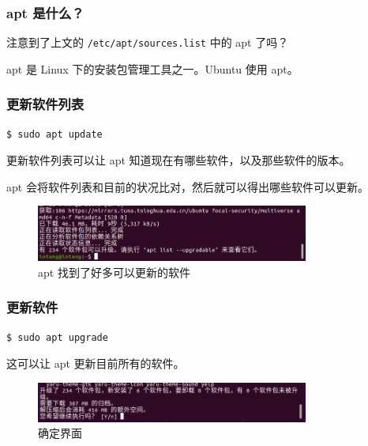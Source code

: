 \documentclass[UTF-8]{ctexart}
\begin{document}
			\subsubsection{apt 是什么？}
			
				注意到了上文的 \texttt{/etc/apt/sources.list} 中的 apt 了吗？
	
				apt 是 Linux 下的安装包管理工具之一。Ubuntu 使用 apt。
				
			\subsubsection{更新软件列表}
				
				\begin{verbatim}
$ sudo apt update
				\end{verbatim}
			
				更新软件列表可以让 apt 知道现在有哪些软件，以及那些软件的版本。
				
				apt 会将软件列表和目前的状况比对，然后就可以得出哪些软件可以更新。
				
				\begin{figure}[H]
					\centering
					\includegraphics[width=0.8\textwidth]{fig/apt_update.png}
					\caption*{apt 找到了好多可以更新的软件}
				\end{figure}
			
			\subsubsection{更新软件}
	
				\begin{verbatim}
$ sudo apt upgrade
				\end{verbatim}
				
				这可以让 apt 更新目前所有的软件。
				
				\begin{figure}[H]
					\centering
					\includegraphics[width=0.8\textwidth]{fig/apt_upgrade_yn.png}
					\caption*{确定界面}
				\end{figure}
			
\end{document}
